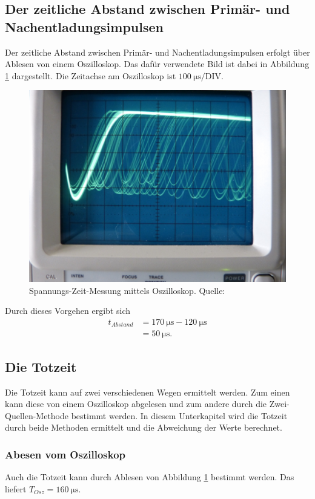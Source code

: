 \subsection{Der zeitliche Abstand zwischen Primär- und Nachentladungsimpulsen}
\label{subsec:abstand}
Der zeitliche Abstand zwischen Primär- und Nachentladungsimpulsen erfolgt über Ablesen von einem
Oszilloskop. Das dafür verwendete Bild ist dabei in Abbildung \ref{fig:Osz} dargestellt. Die Zeitachse
am Oszilloskop ist $\SI{100}{\micro\second}/\text{DIV}$.
\begin{figure}[H]
    \centering
    \includegraphics[scale=0.5]{content/Osz.png}
    \caption{Spannungs-Zeit-Messung mittels Oszilloskop. Quelle:\cite{AP02}}
    \label{fig:Osz}
  \end{figure}
Durch dieses Vorgehen ergibt sich
\begin{align*}
    t_{Abstand}&=\SI{170}{\micro\second}-\SI{120}{\micro\second}\\
               &=\SI{50}{\micro\second}.
\end{align*}

\subsection{Die Totzeit}
\label{subsec:totzeit}
Die Totzeit kann auf zwei verschiedenen Wegen ermittelt werden. Zum einen kann diese von einem Oszilloskop
abgelesen und zum andere durch die Zwei-Quellen-Methode bestimmt werden.
In diesem Unterkapitel wird die Totzeit durch beide Methoden ermittelt und die Abweichung der Werte
berechnet.
\subsubsection*{Abesen vom Oszilloskop}
        Auch die Totzeit kann durch Ablesen von Abbildung \ref{fig:Osz} bestimmt werden. Das liefert
        $T_{Osz}=\SI{160}{\micro\second}$.
